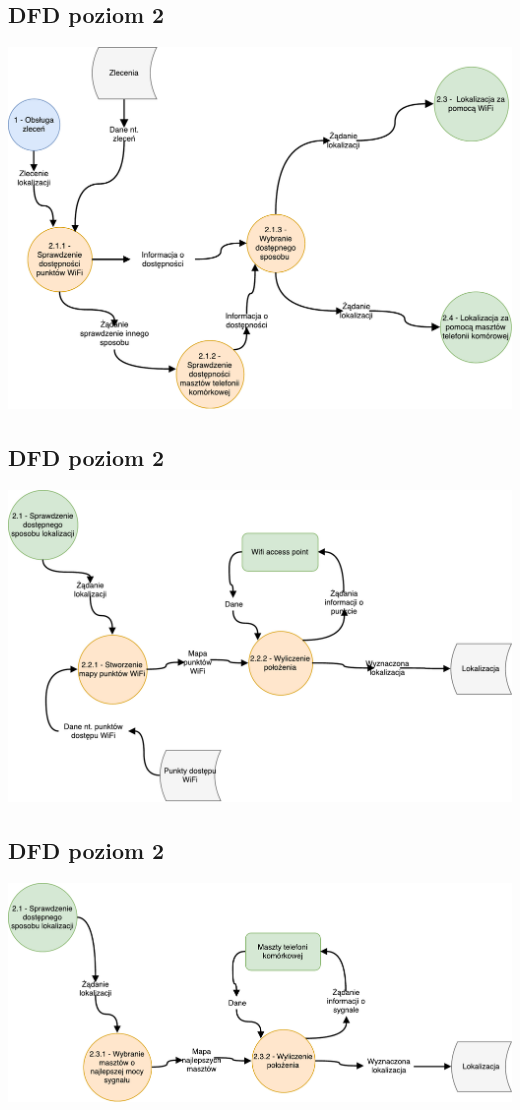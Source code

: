 \documentclass[11pt]{article}
\begin{document}
	\subsection{DFD poziom 2}
	\begin{center}
		\includegraphics[scale=0.6]{DFD21.pdf}
	\end{center}
	\subsection{DFD poziom 2}
	\begin{center}
		\includegraphics[scale=0.6]{DFD22.pdf}
	\end{center}
	\newpage
	\subsection{DFD poziom 2}
	\begin{center}
		\includegraphics[scale=0.65]{DFD23.pdf}
	\end{center}
\end{document}

